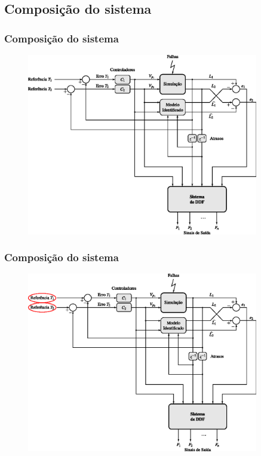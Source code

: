 \documentclass{beamer}
\begin{document}
\subsection{Composição do sistema}
\begin{frame}
    \frametitle{Composição do sistema}

\begin{figure}[htb]
\centering
    \includegraphics[width=0.9\textwidth]{imgs/sistema/eps/composicao_mod_0}
\end{figure}
\end{frame}

\begin{frame}
    \frametitle{Composição do sistema}

\begin{figure}[htb]
\centering
    \includegraphics[width=0.9\textwidth]{imgs/sistema/eps/composicao_mod_1}
\end{figure}
\end{frame}
\end{document}
